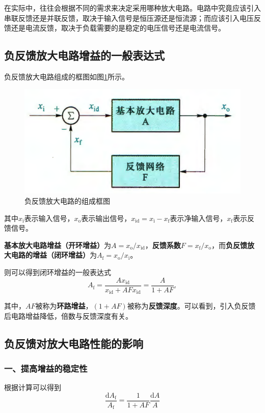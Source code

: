 在实际中，往往会根据不同的需求来决定采用哪种放大电路。电路中究竟应该引入串联反馈还是并联反馈，取决于输入信号是恒压源还是恒流源；而应该引入电压反馈还是电流反馈，取决于负载需要的是稳定的电压信号还是电流信号。

\subsection{负反馈放大电路增益的一般表达式}
负反馈放大电路组成的框图如图\ref{负反馈放大电路的组成框图}所示。

\begin{figure}[htb]
    \centering
    \includegraphics[width=0.5\linewidth]{pic/负反馈放大电路的组成框图.png}
    \caption{负反馈放大电路的组成框图\cite{康华光}\label{负反馈放大电路的组成框图}}
\end{figure}

其中$x_{\mathrm{i}}$表示输入信号，$x_{\mathrm{o}}$表示输出信号，$x_{\mathrm{id}}=x_{\mathrm{i}}-x_{\mathrm{f}}$表示净输入信号，$x_{\mathrm{f}}$表示反馈信号。

\textbf{基本放大电路增益（开环增益）}为$A=x_{\mathrm{o}}/x_{\mathrm{id}}$，\textbf{反馈系数}$F=x_{\mathrm{f}}/x_{\mathrm{o}}$，而\textbf{负反馈放大电路的增益（闭环增益）}为$A_{\mathrm{f}}=x_{\mathrm{o}}/x_{\mathrm{i}}$。

则可以得到闭环增益的一般表达式
\begin{equation}\label{闭环增益}
    A_{\mathrm{f}}=\frac{Ax_{\mathrm{id}}}{x_{\mathrm{id}}+AFx_{\mathrm{id}}}=\frac{A}{1+AF},
\end{equation}

其中，$AF$被称为\textbf{环路增益}，$(1+AF)$被称为\textbf{反馈深度}。可以看到，引⼊负反馈后电路增益降低，倍数与反馈深度有关。

\subsection{负反馈对放大电路性能的影响}

\subsubsection{一、提高增益的稳定性}
根据计算可以得到
\begin{equation}
    \frac{\mathrm{d}A_{\mathrm{f}}}{A_{\mathrm{f}}}=\frac{1}{1+AF}\frac{\mathrm{d}A}{A}
\end{equation}

